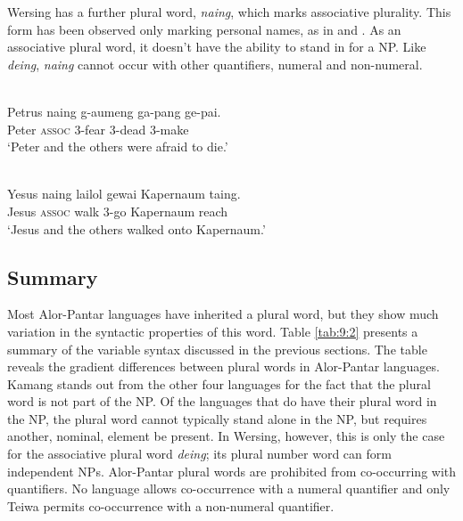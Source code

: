 Wersing has a further plural word, \textit{naing}, which marks associative plurality. This form has been observed only marking personal names, as in  and . As an associative plural word, it doesn't have the ability to stand in for a NP. Like \textit{deing}, \textit{naing} cannot occur with other quantifiers, numeral and non-numeral.


\ea%
\label{ex:9:63}
 \\
\gll  Petrus naing g-aumeng ga-pang ge-pai. \\
  Peter \textsc{assoc} 3-fear 3-dead 3-make   \\
\glt `Peter and the others were afraid to die.'
\z







\ea%
\label{ex:9:64}
 \\
\gll  Yesus naing lailol gewai Kapernaum {taing.}\\
  Jesus \textsc{assoc} walk 3-go Kapernaum reach  \\
\glt `Jesus and the others walked onto Kapernaum.'
\z






\subsection{Summary}  %
\label{sec:9:3.6}

Most Alor-Pantar languages have inherited a plural word, but they show much variation in the syntactic properties of this word. Table \ref{tab:9:2} presents a summary of the variable syntax discussed in the previous sections. The table reveals the gradient differences between plural words in Alor-Pantar languages. Kamang stands out from the other four languages for the fact that the plural word is not part of the NP. Of the languages that do have their plural word in the NP, the plural word cannot typically stand alone in the NP, but requires another, nominal, element be present. In Wersing, however, this is only the case for the associative plural word \textit{deing}; its plural number word can form independent NPs. Alor-Pantar plural words are prohibited from co-occurring with quantifiers. No language allows co-occurrence with a numeral quantifier and only Teiwa permits co-occurrence with a non-numeral quantifier.

